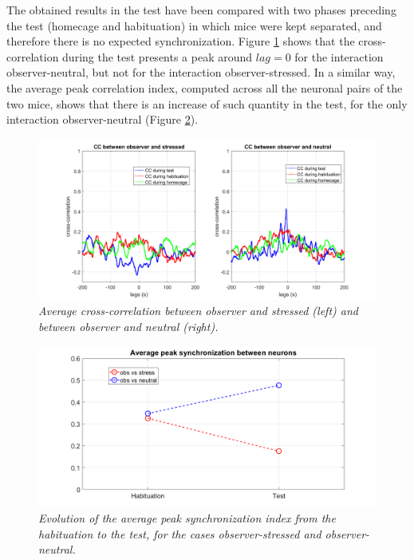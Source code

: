 \documentclass[11pt,a4paper,twocolumn]{article}
\begin{document}
The obtained results in the test have been compared with two phases preceding the test (homecage and habituation) in which mice were kept separated, and therefore there is no expected synchronization. Figure \ref{cc} shows that the cross-correlation during the test presents a peak around $lag=0$ for the interaction observer-neutral, but not for the interaction observer-stressed. In a similar way, the average peak correlation index, computed across all the neuronal pairs of the two mice, shows that there is an increase of such quantity in the test, for the only interaction observer-neutral (Figure \ref{avg_pks}).

\begin{figure}[H]
	
	\begin{center}
		\hspace*{-0.8cm}
		\includegraphics[scale=.25]{average_cc.png} 
	\end{center} 
	\caption{\textit{Average cross-correlation between observer and stressed (left) and  between observer and neutral (right).}} \label{cc}
	
\end{figure}

\begin{figure}[H]
	
	\begin{center}
		\hspace*{-0.8cm}
		\includegraphics[scale=.25]{avg_pks.png} 
	\end{center} 
	\caption{\textit{Evolution of the average peak synchronization index from the habituation to the test, for the cases observer-stressed and observer-neutral.}} \label{avg_pks}
	
\end{figure}
\end{document}
